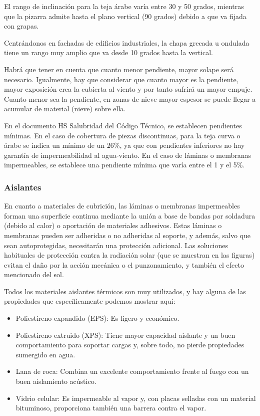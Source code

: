El rango de inclinación para la teja árabe varía entre 30 y 50 grados, mientras que la pizarra admite hasta el plano vertical (90 grados) debido a que va fijada con grapas.

Centrándonos en fachadas de edificios industriales, la chapa grecada u ondulada tiene un rango muy amplio que va desde 10 grados hasta la vertical.

Habrá que tener en cuenta que cuanto menor pendiente, mayor solape será necesario. Igualmente, hay que considerar que cuanto mayor es la pendiente, mayor exposición crea la cubierta al viento y por tanto sufrirá un mayor empuje. Cuanto menor sea la pendiente, en zonas de nieve mayor espesor se puede llegar a acumular de material (nieve) sobre ella.

En el documento HS Salubridad del Código Técnico, se establecen pendientes mínimas. En el caso de cobertura de piezas discontinuas, para la teja curva o árabe se indica un mínimo de un 26\%, ya que con pendientes inferiores no hay garantía de impermeabilidad al agua-viento. En el caso de láminas o membranas impermeables, se establece una pendiente mínima que varía entre el 1 y el 5\%.

\subsubsection*{Aislantes}

En cuanto a materiales de cubrición, las láminas o membranas impermeables forman una superficie continua mediante la unión a base de bandas por soldadura (debido al calor) o aportación de materiales adhesivos. Estas láminas o membranas pueden ser adheridas o no adheridas al soporte, y además, salvo que sean autoprotegidas, necesitarán una protección adicional. Las soluciones habituales de protección contra la radiación solar (que se muestran en las figuras) evitan el daño por la acción mecánica o el punzonamiento, y también el efecto mencionado del sol.

Todos los materiales aislantes térmicos son muy utilizados, y hay alguna de las propiedades que específicamente podemos mostrar aquí:

\begin{itemize}
    \item Poliestireno expandido (EPS): Es ligero y económico.
    \item Poliestireno extruido (XPS): Tiene mayor capacidad aislante y un buen comportamiento para soportar cargas y, sobre todo, no pierde propiedades sumergido en agua.
    \item Lana de roca: Combina un excelente comportamiento frente al fuego con un buen aislamiento acústico.
    \item Vidrio celular: Es impermeable al vapor y, con placas selladas con un material bituminoso, proporciona también una barrera contra el vapor.
\end{itemize}

